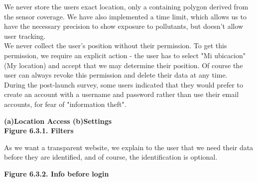 We never store the users exact location, only a containing polygon derived from the sensor coverage.
We have also implemented a time limit, which allows us to have the necessary precision to show exposure to pollutants, but doesn't allow user tracking.\\

We never collect the user's position without their permission.
To get this permission, we require an explicit action - the user has to select "Mi ubicacion" (My location) and accept that we may determine their position.
Of course the user can always revoke this permission and delete their data at any time. \\

During the post-launch survey, some users indicated that they would prefer to create an account with a username and password rather than use their email accounts, for fear of "information theft".\\

\begin{center}
    \bf{ (a)Location Access (b)Settings\\

    Figure 6.3.1. Filters}
  \end{center} 


As we want a transparent website, we explain to the user that we need their data before
they are identified, and of course, the identification is optional. \\

\begin{center}
    \bf{ 
    Figure 6.3.2. Info before login}
  \end{center} 